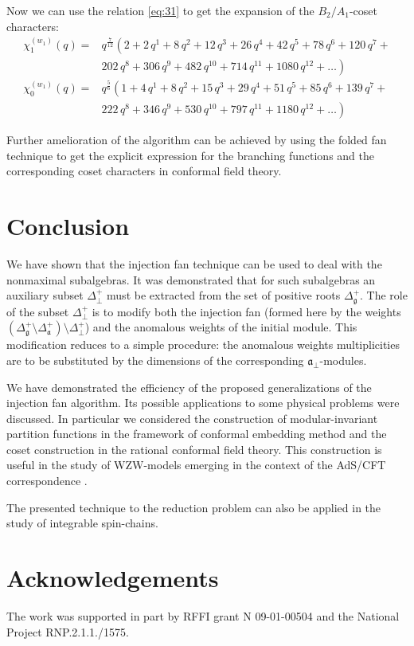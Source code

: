 \documentclass[a4paper,12pt]{article}
\theoremstyle{definition} \newtheorem{Def}{Definition}
\begin{document}
Now we can use the relation \eqref{eq:31} to get the expansion of the $B_2/A_1$-coset characters:
\begin{equation}
  \label{eq:35}
  \begin{array}{cc}
    \chi^{(w_1)}_{1}(q)= & q^{\frac{7}{12}}\left( 2+2\,q^{1}+8\,q^{2}+12\,q^{3}+26\,q^{4}+42\,q^{5}+78\,q^{6}+120\,q^{7}+\right. \\
    & \left. 202\,q^{8}+306\,q^{9}+482\,q^{10}+714\,q^{11}+1080\,q^{12}+\dots \right)\\
    \chi^{(w_1)}_{0}(q) = & q^{\frac{5}{6}}\left(1 + 4\,q^{1}+ 8\,q^{2}+ 15\,q^{3}+ 29\,q^{4}+ 51\,q^{5}+ 85\,q^{6}+ 139\,q^{7}+\right. \\
    &\left. 222\,q^{8}+ 346\,q^{9}+ 530\,q^{10}+ 797\,q^{11}+ 1180\,q^{12}+\dots\right)
  \end{array}
\end{equation}

Further amelioration of the algorithm can be achieved by using
the folded fan technique \cite{il2010folded} to get the explicit expression
for the branching functions and the corresponding coset characters in conformal field theory.

\section{Conclusion}
\label{sec:conclusion}
We have shown that the injection fan technique can be used to deal with the nonmaximal subalgebras.
It was demonstrated that for such subalgebras an auxiliary subset $\Delta^{+}_{\bot}$ must be extracted
from the set of positive roots $\Delta_{\mathfrak{g}}^{+}$.
The role of the subset $\Delta^{+}_{\bot}$ is to modify both the injection fan (formed here by the
weights $\left(\Delta_{\mathfrak{g}}^{+} \setminus  \Delta_{\mathfrak{a}}^{+}\right) \setminus \Delta^{+}_{\bot}$)
and the anomalous weights of the initial module.
This modification reduces to a simple procedure:
the anomalous weights multiplicities are to be substituted by the dimensions of the corresponding ${\mathfrak{a}}_{\bot}$-modules.

We have demonstrated the efficiency of the proposed generalizations of the injection fan algorithm.
Its possible applications to some physical problems were discussed.
In particular we considered the construction of modular-invariant partition functions
in the framework of conformal embedding method and the coset construction in the rational conformal field theory.
This construction is useful in the study of WZW-models
emerging in the context of the AdS/CFT correspondence \cite{Maldacena:2000hw,Maldacena:2000kv,Maldacena:2001km}.

The presented technique to the reduction problem can also be applied in the study of integrable spin-chains.

\section{Acknowledgements}
The work was supported in
part by RFFI grant N 09-01-00504 and the National Project RNP.2.1.1./1575.

{}

\end{document}
